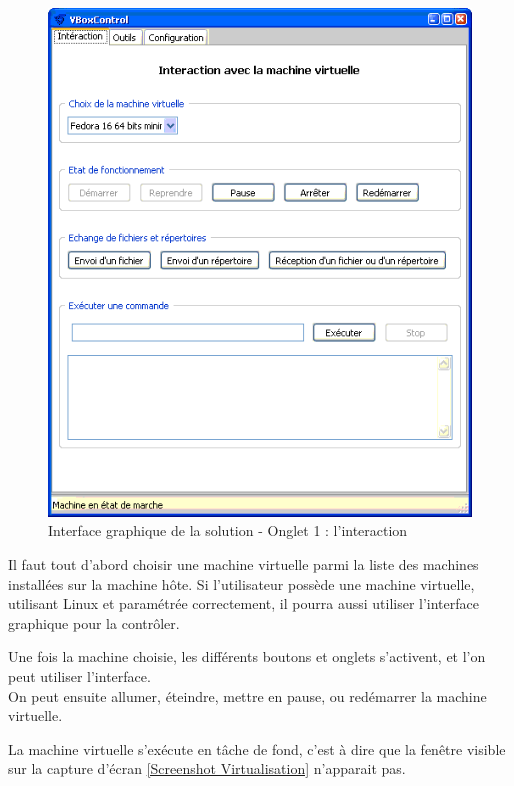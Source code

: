 \begin{figure}[!h]
	\center
	\includegraphics[scale=0.6]{img/Interface_solution_1.png}
	\caption{Interface graphique de la solution - Onglet 1 : l'interaction}
	\label{Interface graphique de la solution - Onglet 1 : l'interaction}
\end{figure}


Il faut tout d'abord choisir une machine virtuelle parmi la liste des machines installées sur la machine hôte.
Si l'utilisateur possède une machine virtuelle, utilisant Linux et paramétrée correctement, il pourra aussi utiliser l'interface graphique pour la contrôler.

Une fois la machine choisie, les différents boutons et onglets s'activent, et l'on peut utiliser l'interface.
\\


On peut ensuite allumer, éteindre, mettre en pause, ou redémarrer la machine virtuelle.

La machine virtuelle s'exécute en tâche de fond, c'est à dire que la fenêtre visible sur la capture d'écran \ref{Screenshot Virtualisation} n'apparait pas.
\\


